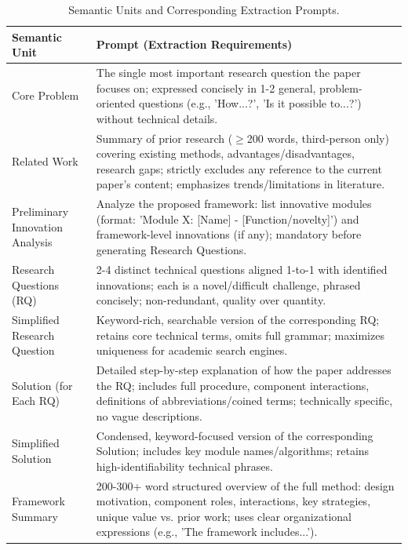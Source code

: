 \documentclass[runningheads]{llncs}
\begin{document}
\begin{table}[h]
\centering
\setlength\tabcolsep{6pt}
\renewcommand{\arraystretch}{1.4}
\small
\begin{tabular}{p{3.5cm}p{9.5cm}}
\toprule
\textbf{Semantic Unit} & \textbf{Prompt (Extraction Requirements)} \\
\midrule
Core Problem & The single most important research question the paper focuses on; expressed concisely in 1-2 general, problem-oriented questions (e.g., 'How...?', 'Is it possible to...?') without technical details. \\
\midrule
Related Work & Summary of prior research ($\geq$200 words, third-person only) covering existing methods, advantages/disadvantages, research gaps; strictly excludes any reference to the current paper's content; emphasizes trends/limitations in literature. \\
\midrule
Preliminary Innovation Analysis & Analyze the proposed framework: list innovative modules (format: 'Module X: [Name] - [Function/novelty]') and framework-level innovations (if any); mandatory before generating Research Questions. \\
\midrule
Research Questions (RQ) & 2-4 distinct technical questions aligned 1-to-1 with identified innovations; each is a novel/difficult challenge, phrased concisely; non-redundant, quality over quantity. \\
\midrule
Simplified Research Question & Keyword-rich, searchable version of the corresponding RQ; retains core technical terms, omits full grammar; maximizes uniqueness for academic search engines. \\
\midrule
Solution (for Each RQ) & Detailed step-by-step explanation of how the paper addresses the RQ; includes full procedure, component interactions, definitions of abbreviations/coined terms; technically specific, no vague descriptions. \\
\midrule
Simplified Solution & Condensed, keyword-focused version of the corresponding Solution; includes key module names/algorithms; retains high-identifiability technical phrases. \\
\midrule
Framework Summary & 200-300+ word structured overview of the full method: design motivation, component roles, interactions, key strategies, unique value vs. prior work; uses clear organizational expressions (e.g., 'The framework includes...'). \\
\bottomrule
\end{tabular}
\caption{Semantic Units and Corresponding Extraction Prompts.}
\label{tab:semantic_prompt_extraction}
\end{table}
\end{document}
